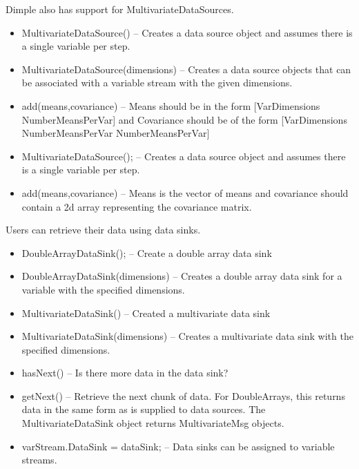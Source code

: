 Dimple also has support for MultivariateDataSources.

\ifmatlab
\begin{itemize}
\item MultivariateDataSource() -- Creates a data source object and assumes there is a single variable per step.
\item MultivariateDataSource(dimensions) -- Creates a data source objects that can be associated with a variable stream with the given dimensions.
\item add(means,covariance) -- Means should be in the form [VarDimensions NumberMeansPerVar] and Covariance should be of the form [VarDimensions NumberMeansPerVar NumberMeansPerVar] 
\end{itemize}
\fi

\ifjava
\begin{itemize}
\item MultivariateDataSource(); -- Creates a data source object and assumes there is a single variable per step.
\item add(means,covariance) -- Means is the vector of means and covariance should contain a 2d array representing the covariance matrix.
\end{itemize}
\fi


Users can retrieve their data using data sinks.

\ifmatlab
\begin{itemize}
\item DoubleArrayDataSink(); -- Create a double array data sink
\item DoubleArrayDataSink(dimensions) -- Creates a double array data sink for a variable with the specified dimensions.
\item MultivariateDataSink() -- Created a multivariate data sink
\item MultivariateDataSink(dimensions) -- Creates a multivariate data sink with the specified dimensions.
\item hasNext() -- Is there more data in the data sink?
\item getNext() -- Retrieve the next chunk of data.  For DoubleArrays, this returns data in the same form as is supplied to data sources.  The MultivariateDataSink object returns MultivariateMsg objects.
\item varStream.DataSink = dataSink; -- Data sinks can be assigned to variable streams.
\end{itemize}
\fi

